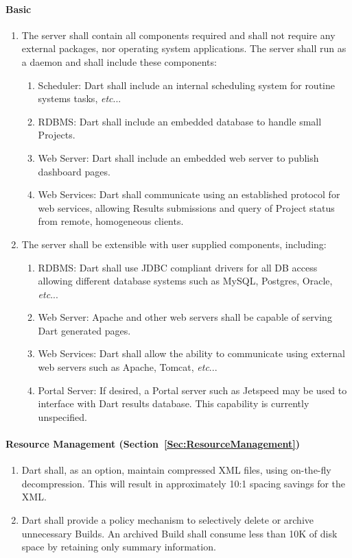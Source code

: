 \documentclass{InsightBook}
\makeatletter
\DeclareRobustCommand\onedot{\futurelet\@let@token\@onedot}
\def\@onedot{\ifx\@let@token.\else.\xspace\fi}
\def\etc{\emph{etc}\onedot}
\makeatother
\begin{document}
\paragraph{Basic}
\begin{enumerate}
\item The server shall contain all components required and shall not
require any external packages, nor operating system applications.
The server shall run as a daemon and shall include these components:
        \begin{enumerate}
        \item Scheduler: Dart shall include an internal scheduling
system for routine systems tasks, \etc.
        \item RDBMS: Dart shall include an embedded database to
handle small Projects.
        \item Web Server: Dart shall include an embedded web server
to publish dashboard pages.
        \item Web Services: Dart shall communicate using an
established protocol for web services, allowing Results submissions
and query of Project status from remote, homogeneous clients.
        \end{enumerate}
\item The server shall be extensible with user supplied components,
including:
        \begin{enumerate}
        \item RDBMS: Dart shall use JDBC compliant drivers for all DB
access allowing different database systems such as MySQL, Postgres,
Oracle, \etc.
        \item Web Server: Apache and other web servers shall be
capable of serving Dart generated pages.
        \item Web Services: Dart shall allow the ability to
communicate using external web servers such as Apache, Tomcat,
\etc.
        \item Portal Server: If desired, a Portal server such as
Jetspeed may be used to interface with Dart results database.  This
capability is currently unspecified.
        \end{enumerate}
\end{enumerate}
\paragraph{Resource Management (Section~\ref{Sec:ResourceManagement})}
\begin{enumerate}
\item Dart shall, as an option, maintain compressed XML files, using
on-the-fly decompression.  This will result in approximately 10:1
spacing savings for the XML. 
\item Dart shall provide a policy mechanism to selectively delete
or archive unnecessary Builds.  An archived Build shall consume less
than 10K of disk space by retaining only summary information.
\end{enumerate}
\end{document}
